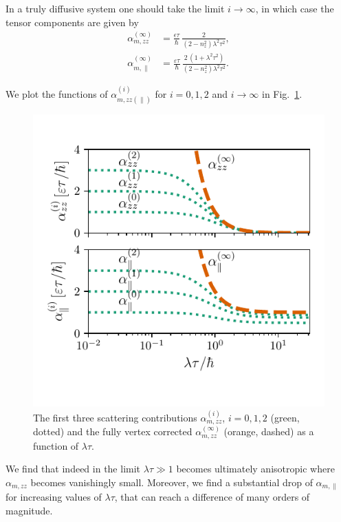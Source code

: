 In a truly diffusive system one should take the limit $i\rightarrow\infty$, in which case the tensor components are given by
\begin{align}
\label{eq:alphaparallelzerodelta}
    \alpha_{m,zz}^{(\infty)}  & = \frac{\epsilon \tau}{\hbar}\, \frac{2}{(2-n_z^2)\lambda^2\tau^2},\\
    \alpha_{m,\parallel}^{(\infty)}  & = \frac{\varepsilon\tau}{\hbar}\,\frac{2\,(1+\lambda^2\tau^2)}{(2-n_z^2)\lambda^2\tau^2}.
\end{align}

We plot the functions of $\alpha_{m,zz(\parallel)}^{(i)}$ for $i=0,1,2$ and $i\rightarrow\infty$ in Fig.~\ref{fig:alpha_plot}. 
\begin{figure}
    \centering
    \includegraphics[width=\linewidth]{gfx/Chapter04/alpha_plot2}
    \caption{The first three scattering contributions $\alpha_{m,zz}^{(i)}$, $i=0,1,2$ (green, dotted) and the fully vertex corrected $\alpha_{m,zz}^{(\infty)}$ (orange, dashed) as a function of $\lambda \tau$. }
    \label{fig:alpha_plot}
\end{figure}
We find that indeed in the limit $\lambda\tau\gg1$ becomes ultimately anisotropic where $\alpha_{m,zz}$ becomes vanishingly small. Moreover, we find a substantial drop of $\alpha_{m,\parallel}$ for increasing values of $\lambda\tau$, that can reach a difference of many orders of magnitude. 

